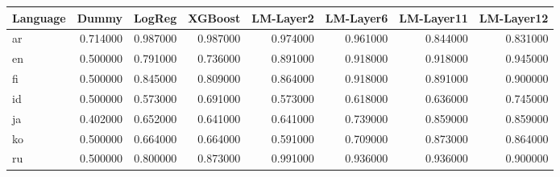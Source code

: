 \begin{tabular}{lrrrrrrr}
\toprule
Language & Dummy & LogReg & XGBoost & LM-Layer2 & LM-Layer6 & LM-Layer11 & LM-Layer12 \\
\midrule
ar & 0.714000 & 0.987000 & 0.987000 & 0.974000 & 0.961000 & 0.844000 & 0.831000 \\
en & 0.500000 & 0.791000 & 0.736000 & 0.891000 & 0.918000 & 0.918000 & 0.945000 \\
fi & 0.500000 & 0.845000 & 0.809000 & 0.864000 & 0.918000 & 0.891000 & 0.900000 \\
id & 0.500000 & 0.573000 & 0.691000 & 0.573000 & 0.618000 & 0.636000 & 0.745000 \\
ja & 0.402000 & 0.652000 & 0.641000 & 0.641000 & 0.739000 & 0.859000 & 0.859000 \\
ko & 0.500000 & 0.664000 & 0.664000 & 0.591000 & 0.709000 & 0.873000 & 0.864000 \\
ru & 0.500000 & 0.800000 & 0.873000 & 0.991000 & 0.936000 & 0.936000 & 0.900000 \\
\bottomrule
\end{tabular}
